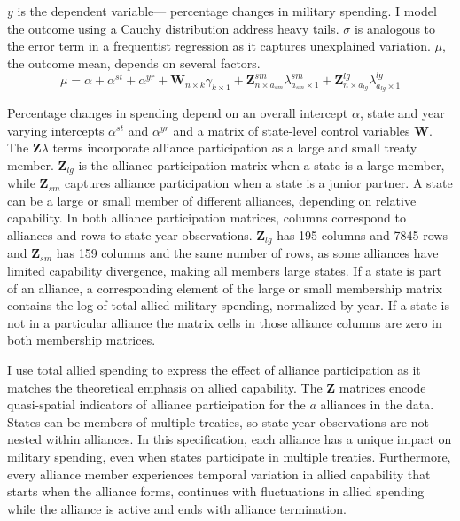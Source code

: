 \documentclass[12pt]{article}
\begin{document}
$y$ is the dependent variable--- percentage changes in military spending. 
I model the outcome using a Cauchy distribution address heavy tails.
$\sigma$ is analogous to the error term in a frequentist regression as it captures unexplained variation.  
$\mu$, the outcome mean, depends on several factors.
\begin{equation}
\mu = \alpha + \alpha^{st} + \alpha^{yr} +\textbf{W}_{n \times k} \gamma_{k \times 1} + \textbf{Z}^{sm}_{n \times a_{sm}} \lambda^{sm}_{a_{sm} \times 1} + \textbf{Z}^{lg}_{n \times a_{lg}} \lambda^{lg}_{a_{lg} \times 1} 
\end{equation}


Percentage changes in spending depend on an overall intercept $\alpha$, state and year varying intercepts $\alpha^{st}$ and $\alpha^{yr}$ and a matrix of state-level control variables $\textbf{W}$.
The $\textbf{Z} \lambda$ terms incorporate alliance participation as a large and small treaty member. 
$\textbf{Z}_{lg}$ is the alliance participation matrix when a state is a large member, while $\textbf{Z}_{sm}$ captures alliance participation when a state is a junior partner. 
A state can be a large or small member of different alliances, depending on relative capability. 
In both alliance participation matrices, columns correspond to alliances and rows to state-year observations. 
$\textbf{Z}_{lg}$ has 195 columns and 7845 rows and $\textbf{Z}_{sm}$ has 159 columns and the same number of rows, as some alliances have limited capability divergence, making all members large states. 
If a state is part of an alliance, a corresponding element of the large or small membership matrix contains the log of total allied military spending, normalized by year.
If a state is not in a particular alliance the matrix cells in those alliance columns are zero in both membership matrices.


I use total allied spending to express the effect of alliance participation as it matches the theoretical emphasis on allied capability. 
The $\textbf{Z}$ matrices encode quasi-spatial indicators of alliance participation for the $a$ alliances in the data. 
States can be members of multiple treaties, so state-year observations are not nested within alliances. 
In this specification, each alliance has a unique impact on military spending, even when states participate in multiple treaties. 
Furthermore, every alliance member experiences temporal variation in allied capability that starts when the alliance forms, continues with fluctuations in allied spending while the alliance is active and ends with alliance termination. 
\end{document}
